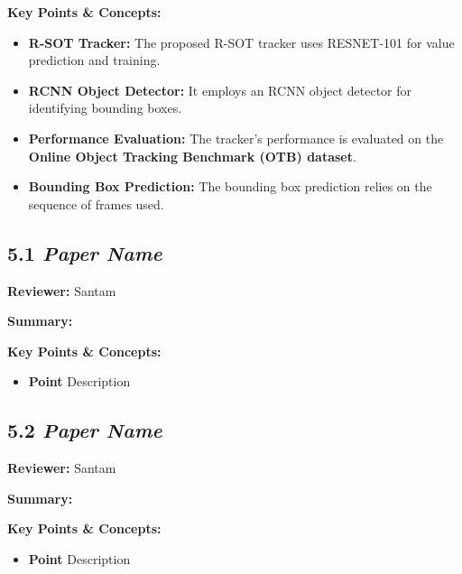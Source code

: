 \documentclass{article}
\begin{document}
\textbf{Key Points \& Concepts:}
\begin{itemize}
  \item \textbf{R-SOT Tracker:} The proposed R-SOT tracker uses RESNET-101 for value prediction and training.
  \item \textbf{RCNN Object Detector:} It employs an RCNN object detector for identifying bounding boxes.
  \item \textbf{Performance Evaluation:} The tracker's performance is evaluated on the \textbf{Online Object Tracking Benchmark (OTB) dataset}.
  \item \textbf{Bounding Box Prediction:} The bounding box prediction relies on the sequence of frames used.
\end{itemize}

\subsection*{5.1 \textit{Paper Name}}

\hspace*{\parindent}\textbf{Reviewer:} Santam

\vspace{0.3cm}

\textbf{Summary:}

\vspace{0.3cm}

\textbf{Key Points \& Concepts:}
\begin{itemize}
  \item \textbf{Point} Description
\end{itemize}

\subsection*{5.2 \textit{Paper Name}}

\hspace*{\parindent}\textbf{Reviewer:} Santam

\vspace{0.3cm}

\textbf{Summary:}

\vspace{0.3cm}

\textbf{Key Points \& Concepts:}
\begin{itemize}
  \item \textbf{Point} Description
\end{itemize}
\end{document}
